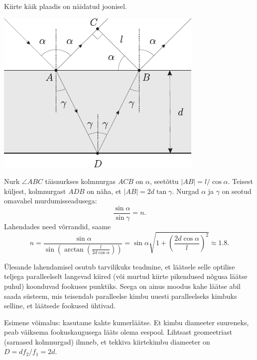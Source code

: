 \documentclass[10pt, twoside]{article}
\begin{document}
{%

\solu
Kiirte käik plaadis on näidatud joonisel.

\begin{center}
	\includegraphics[width=0.7\linewidth]{2007-lahg-04-lah}
\end{center}

Nurk $\angle ABC$ täisnurkses kolmnurgas $ACB$ on $\alpha$, seetõttu $|AB| = l/ \cos \alpha$. Teisest küljest, kolmnurgast $ADB$ on näha, et $|AB| = 2d \tan \gamma$. Nurgad $\alpha$ ja $\gamma$ on seotud omavahel murdumisseadusega:
\[
\frac{\sin\alpha}{\sin\gamma} = n.
\]
Lahendades need võrrandid, saame
\[
n=\frac{\sin\alpha}{\sin\left(\arctan\left(\frac{l}{2d\cos\alpha}\right)\right)} =\sin \alpha \sqrt{1+\left(\frac{2 d \cos \alpha}{l}\right)^{2}} \approx \num{1,8}.
\]
\probend
\bigskip


\solu
Ülesande lahendamisel osutub tarvilikuks teadmine, et läätsele selle optilise teljega paralleelselt langevad kiired (või murtud kiirte pikendused nõgusa läätse puhul) koonduvad fookuses punktiks. Seega on ainus moodus kahe läätse abil saada süsteem, mis teisendab paralleelse kimbu uuesti paralleelseks kimbuks selline, et läätsede fookused ühtivad. 

Esimene võimalus: kasutame kahte kumerläätse. Et kimbu diameeter suureneks, peab väiksema fookuskaugusega lääts olema eespool. Lihtsast geomeetriast (sarnased kolmnurgad) ilmneb, et tekkiva kiirtekimbu diameeter on $D = df_2/f_1 = 2d$.

}
\end{document}
